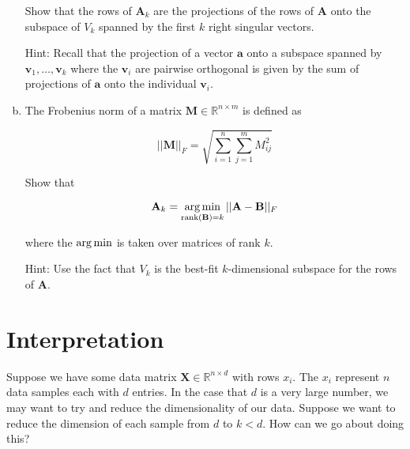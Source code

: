 \begin{enumerate}[(a)]
    Show that the rows of $\textbf{A}_{k}$ are the projections of the rows of $\textbf{A}$ onto the subspace of $V_{k}$ spanned by the first $k$ right singular vectors.  \newline
    
    Hint: Recall that the projection of a vector $\textbf{a}$ onto a subspace spanned by $\textbf{v}_1, \dots, \textbf{v}_k$ where the $\textbf{v}_i$ are pairwise orthogonal is given by the sum of projections of $\textbf{a}$ onto the individual $\textbf{v}_i$. 
    
    \newpage
    
    
    \item {} The Frobenius norm of a matrix $\textbf{M} \in \mathbb{R}^{n \times m}$ is defined as 
    
    \begin{equation}
        \vert \vert \textbf{M}\vert \vert _{F} = \sqrt{\sum_{i=1}^{n} \sum_{j=1}^{m} M_{ij}^2}
        \label{frob}
    \end{equation}
    
    Show that 
    
    \begin{equation}
        \textbf{A}_{k} = \operatorname*{arg\,min}_{\textrm{rank}(\textbf{B}) = k}\vert \vert \textbf{A} - \textbf{B}\vert \vert _{F}
        \label{frob_min}
    \end{equation}

    where the $\operatorname*{arg\,min}$ is taken over matrices of rank $k$. \newline
    
    Hint: Use the fact that $V_{k}$ is the best-fit $k$-dimensional subspace for the rows of $\textbf{A}$.
    
    \newpage
    
\end{enumerate}

\section{Interpretation}

Suppose we have some data matrix $\textbf{X} \in \mathbb{R}^{n \times d}$ with rows $x_i$. The $x_i$ represent $n$ data samples each with $d$ entries. In the case that $d$ is a very large number, we may want to try and reduce the dimensionality of our data. Suppose we want to reduce the dimension of each sample from $d$ to $k < d$. How can we go about doing this? \newline

